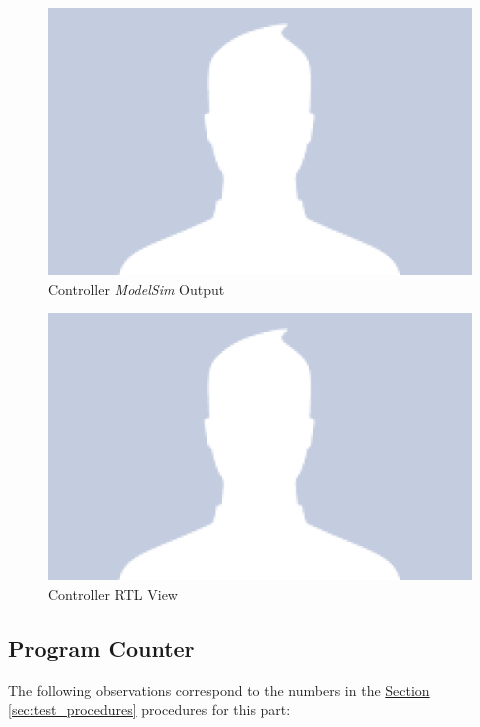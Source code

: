 \begin{figure}
    \includegraphics[width=\textwidth]{images/controller_output.png}
    \caption{Controller \emph{ModelSim} Output\label{fig:controller_output}}
\end{figure}

\begin{figure}
    \includegraphics[width=\textwidth]{images/controller_rtl.png}
    \caption{Controller RTL View\label{fig:controller_rtl}}
\end{figure}


\FloatBarrier \subsection{Program Counter} %
\label{sub:program_counter} \FloatBarrier

The following observations correspond to the numbers in the \hyperref[sec:test_procedures]{Section \ref*{sec:test_procedures}} procedures for this part:

